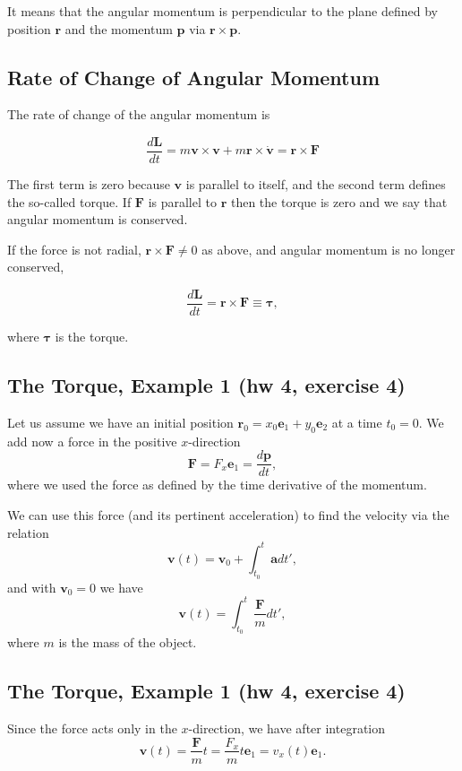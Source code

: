 \documentclass[%
oneside,                 %
final,                   %
10pt]{article}
\begin{document}
It means that the angular momentum is perpendicular to the plane defined by position $\bm{r}$ and the momentum $\bm{p}$ via $\bm{r}\times \bm{p}$. 

\subsection{Rate of Change of Angular Momentum}

The rate of change of the angular momentum is

\[
\frac{d\bm{L}}{dt}=m\bm{v}\times\bm{v}+m\bm{r}\times\dot{\bm{v}}=\bm{r}\times{\bm{F}}
\]

The first term is zero because $\bm{v}$ is parallel to itself, and the
second term defines the so-called torque. If $\bm{F}$ is parallel to $\bm{r}$ then the torque is zero and we say that angular momentum is conserved.

If the force is not radial, $\bm{r}\times\bm{F}\ne 0$ as above, and angular momentum is no longer conserved,

\begin{equation}
\frac{d\bm{L}}{dt}=\bm{r}\times\bm{F}\equiv\bm{\tau},
\end{equation}

where $\bm{\tau}$ is the torque.

\subsection{The Torque, Example 1 (hw 4, exercise 4)}

Let us assume we have an initial position $\bm{r}_0=x_0\bm{e}_1+y_0\bm{e}_2$ at a time $t_0=0$.
We add now a force in the positive $x$-direction
\[
\bm{F}=F_x\bm{e}_1=\frac{d\bm{p}}{dt},
\]
where we used the force as defined by the time derivative of the momentum.

We can use this force (and its pertinent acceleration) to find the velocity via the relation
\[
\bm{v}(t)=\bm{v}_0+\int_{t_0}^t\bm{a}dt',
\]
and with $\bm{v}_0=0$ we have
\[
\bm{v}(t)=\int_{t_0}^t\frac{\bm{F}}{m}dt',
\]
where $m$ is the mass of the object.

\subsection{The Torque, Example 1 (hw 4, exercise 4)}

Since the force acts only in the $x$-direction, we have after integration
\[
\bm{v}(t)=\frac{\bm{F}}{m}t=\frac{F_x}{m}t\bm{e}_1=v_x(t)\bm{e}_1.
\]
\end{document}

